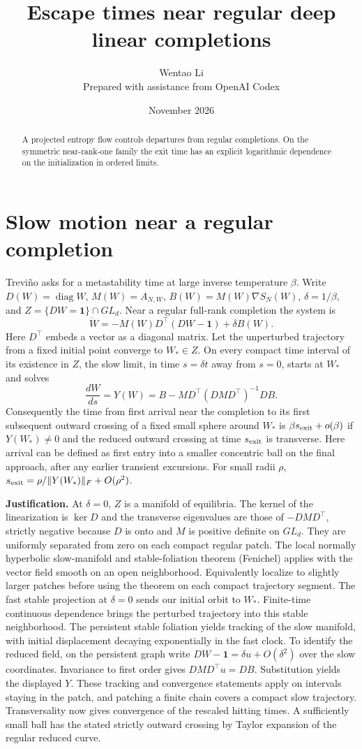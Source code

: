 \documentclass[10pt]{article}
\title{Escape times near regular deep linear completions}
\author{Wentao Li\\{\small Prepared with assistance from OpenAI Codex}}
\date{November 2026}
\begin{document}
\maketitle
\begin{abstract}
A projected entropy flow controls departures from regular completions. On the symmetric near-rank-one family the exit time has an explicit logarithmic dependence on the initialization in ordered limits.
\end{abstract}
\section*{Slow motion near a regular completion}
Treviño asks for a metastability time at large inverse temperature $\beta$. Write $D(W)=\operatorname{diag}W$, $M(W)=A_{N,W}$, $B(W)=M(W)\nabla S_N(W)$, $\delta=1/\beta$, and $Z=\{DW=\mathbf1\}\cap GL_d$. Near a regular full-rank completion the system is
\[
 \dot W=-M(W)D^\top(DW-\mathbf1)+\delta B(W).
\]
Here $D^\top$ embeds a vector as a diagonal matrix. Let the unperturbed trajectory from a fixed initial point converge to $W_*\in Z$. On every compact time interval of its existence in $Z$, the slow limit, in time $s=\delta t$ away from $s=0$, starts at $W_*$ and solves
\[
 \frac{dW}{ds}=Y(W)= B-MD^\top(DMD^\top)^{-1}DB .
\]
Consequently the time from first arrival near the completion to its first subsequent outward crossing of a fixed small sphere around $W_*$ is $\beta s_{\rm exit}+o(\beta)$ if $Y(W_*)\ne0$ and the reduced outward crossing at time $s_{\rm exit}$ is transverse. Here arrival can be defined as first entry into a smaller concentric ball on the final approach, after any earlier transient excursions. For small radii $\rho$, $s_{\rm exit}=\rho/\|Y(W_*)\|_F+O(\rho^2)$.

\textbf{Justification.} At $\delta=0$, $Z$ is a manifold of equilibria. The kernel of the linearization is $\ker D$ and the transverse eigenvalues are those of $-DMD^\top$, strictly negative because $D$ is onto and $M$ is positive definite on $GL_d$. They are uniformly separated from zero on each compact regular patch. The local normally hyperbolic slow-manifold and stable-foliation theorem (Fenichel) applies with the vector field smooth on an open neighborhood. Equivalently localize to slightly larger patches before using the theorem on each compact trajectory segment. The fast stable projection at $\delta=0$ sends our initial orbit to $W_*$. Finite-time continuous dependence brings the perturbed trajectory into this stable neighborhood. The persistent stable foliation yields tracking of the slow manifold, with initial displacement decaying exponentially in the fast clock. To identify the reduced field, on the persistent graph write $DW-\mathbf1=\delta u+O(\delta^2)$ over the slow coordinates. Invariance to first order gives $DMD^\top u=DB$. Substitution yields the displayed $Y$. These tracking and convergence statements apply on intervals staying in the patch, and patching a finite chain covers a compact slow trajectory. Transversality now gives convergence of the rescaled hitting times. A sufficiently small ball has the stated strictly outward crossing by Taylor expansion of the regular reduced curve.
\end{document}
